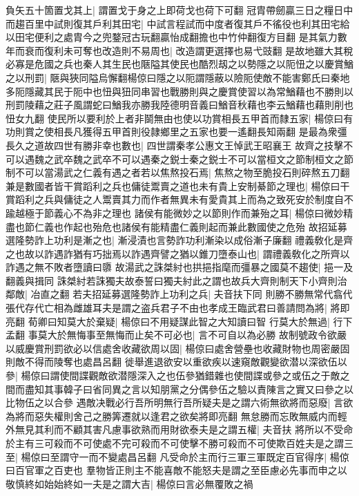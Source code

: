 負矢五十箇置戈其上|{
	謂置戈于身之上即荷戈也荷下可翻}
冠胄帶劒贏三日之糧日中而趨百里中試則復其戶利其田宅|{
	中試言程試而中度者復其戶不徭役也利其田宅給以田宅便利之處胄今之兜鍪冠古玩翻贏怡成翻擔也中竹仲翻復方目翻}
是其氣力數年而衰而復利未可奪也改造則不易周也|{
	改造謂更選擇也易弋豉翻}
是故地雖大其稅必寡是危國之兵也秦人其生民也陿隘其使民也酷烈刼之以勢隱之以阨忸之以慶賞鰌之以刑罰|{
	陿與狹同隘烏懈翻楊倞曰隱之以阨謂隱蔽以險阨使敵不能害鄭氏曰秦地多阨隱藏其民于阨中也忸與狃同串習也戰勝則與之慶賞使習以為常鰌藉也不勝則以刑罰陵藉之莊子風謂蛇曰鰌我亦勝我陸德明音義曰鰌音秋藉也李云鰌藉也藉則削也忸女九翻}
使民所以要利於上者非鬬無由也使以功賞相長五甲首而隸五家|{
	楊倞曰有功則賞之使相長凡獲得五甲首則役隷鄉里之五家也要一遙翻長知兩翻}
是最為衆彊長久之道故四世有勝非幸也數也|{
	四世謂秦孝公惠文王悼武王昭襄王}
故齊之技擊不可以遇魏之武卒魏之武卒不可以遇秦之鋭士秦之鋭士不可以當桓文之節制桓文之節制不可以當湯武之仁義有遇之者若以焦熬投石焉|{
	焦熬之物至脆投石則碎熬五刀翻}
兼是數國者皆干賞蹈利之兵也傭徒鬻賣之道也未有貴上安制綦節之理也|{
	楊倞曰干賞蹈利之兵與傭徒之人鬻賣其力而作者無異未有愛貴其上而為之致死安於制度自不踰越極于節義心不為非之理也}
諸侯有能微妙之以節則作而兼殆之耳|{
	楊倞曰微妙精盡也節仁義也作起也殆危也諸侯有能精盡仁義則起而兼此數國使之危殆}
故招延募選隆勢詐上功利是漸之也|{
	漸浸漬也言勢詐功利漸染以成俗漸子廉翻}
禮義敎化是齊之也故以詐遇詐猶有巧拙焉以詐遇齊譬之猶以錐刀墮泰山也|{
	謂禮義敎化之所齊以詐遇之無不敗者墮讀曰隳}
故湯武之誅桀紂也拱挹指麾而彊暴之國莫不趨使|{
	挹一及翻義與揖同}
誅桀紂若誅獨夫故泰誓曰獨夫紂此之謂也故兵大齊則制天下小齊則治鄰敵|{
	冶直之翻}
若夫招延募選隆勢詐上功利之兵|{
	夫音扶下同}
則勝不勝無常代翕代張代存代亡相為雌雄耳夫是謂之盗兵君子不由也孝成王臨武君曰善請問為將|{
	將即亮翻}
荀卿曰知莫大於棄疑|{
	楊倞曰不用疑謀此智之大知讀曰智}
行莫大於無過|{
	行下孟翻}
事莫大於無悔事至無悔而止矣不可必也|{
	言不可自以為必勝}
故制號政令欲嚴以威慶賞刑罰欲必以信處舍收藏欲周以固|{
	楊倞曰處舍營壘也收藏財物也周密嚴固則敵不得而陵奪也處昌呂翻}
徙舉進退欲安以重欲疾以速窺敵觀變欲潜以深欲伍以參|{
	楊倞曰謂使間諜觀敵欲潜隱深入之也伍參猶錯雜也使間諜或參之或伍之于敵之間而盡知其事韓子曰省同異之言以知朋黨之分偶參伍之驗以責陳言之實又曰參之以比物伍之以合參}
遇敵决戰必行吾所明無行吾所疑夫是之謂六術無欲將而惡廢|{
	言欲為將而惡失權則舍己之勝筭遷就以逢君之欲矣將即亮翻}
無怠勝而忘敗無威内而輕外無見其利而不顧其害凡慮事欲熟而用財欲泰夫是之謂五權|{
	夫音扶}
將所以不受命於主有三可殺而不可使處不完可殺而不可使擊不勝可殺而不可使欺百姓夫是之謂三至|{
	楊倞曰至謂守一而不變處昌呂翻}
凡受命於主而行三軍三軍既定百官得序|{
	楊倞曰百官軍之百吏也}
羣物皆正則主不能喜敵不能怒夫是謂之至臣慮必先事而申之以敬慎終如始始終如一夫是之謂大吉|{
	楊倞曰言必無覆敗之禍}
